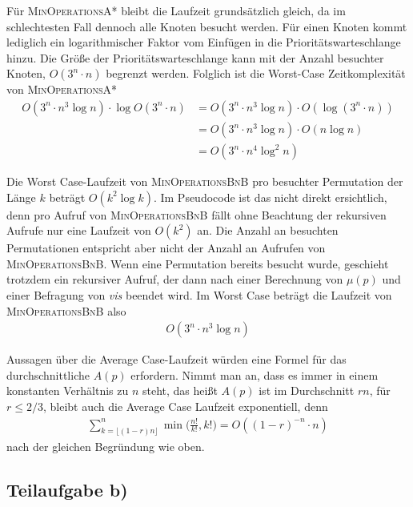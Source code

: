 \documentclass[a4paper, 10pt, ngerman]{article}
\begin{document}
Für \textsc{MinOperationsA*} bleibt die Laufzeit grundsätzlich gleich, da im schlechtesten Fall dennoch alle Knoten besucht werden. Für einen Knoten kommt lediglich ein logarithmischer Faktor vom Einfügen in die Prioritätswarteschlange hinzu. Die Größe der Prioritätswarteschlange kann mit der Anzahl besuchter Knoten, $O(3^n \cdot n)$ begrenzt werden. Folglich ist die Worst-Case Zeitkomplexität von \textsc{MinOperationsA*}
\begin{align*}
    O(3^n \cdot n^3 \log n) \cdot \log O(3^n \cdot n)
     & = O(3^n \cdot n^3 \log n) \cdot O(\log (3^n \cdot n)) \\
     & = O(3^n \cdot n^3 \log n) \cdot O(n \log n)           \\
     & = O(3^n \cdot n^4 \log^2 n)
\end{align*}

Die Worst Case-Laufzeit von \textsc{MinOperationsBnB} pro besuchter Permutation der Länge $k$ beträgt $O(k^2 \log k)$. Im Pseudocode ist das nicht direkt ersichtlich, denn pro Aufruf von \textsc{MinOperationsBnB} fällt ohne Beachtung der rekursiven Aufrufe nur eine Laufzeit von $O(k^2)$ an. Die Anzahl an besuchten Permutationen entspricht aber nicht der Anzahl an Aufrufen von \textsc{MinOperationsBnB}. Wenn eine Permutation bereits besucht wurde, geschieht trotzdem ein rekursiver Aufruf, der dann nach einer Berechnung von $\mu(p)$ und einer Befragung von \emph{vis} beendet wird. Im Worst Case beträgt die Laufzeit von \textsc{MinOperationsBnB} also
\begin{align*}
    O(3^n \cdot n^3 \log n)
\end{align*}

Aussagen über die Average Case-Laufzeit würden eine Formel für das durchschnittliche $A(p)$ erfordern. Nimmt man an, dass es immer in einem konstanten Verhältnis zu $n$ steht, das heißt $A(p)$ ist im Durchschnitt $rn$, für $r \le 2/3$, bleibt auch die Average Case Laufzeit exponentiell, denn
\begin{align*}
    \sum_{k = \lfloor (1 - r)n \rfloor}^n \min \bigg ( \frac {n!}{k!}, k! \bigg ) 
    = O((1 - r)^{-n} \cdot n) 
\end{align*}
nach der gleichen Begründung wie oben.

\subsection{Teilaufgabe b)}
\end{document}
